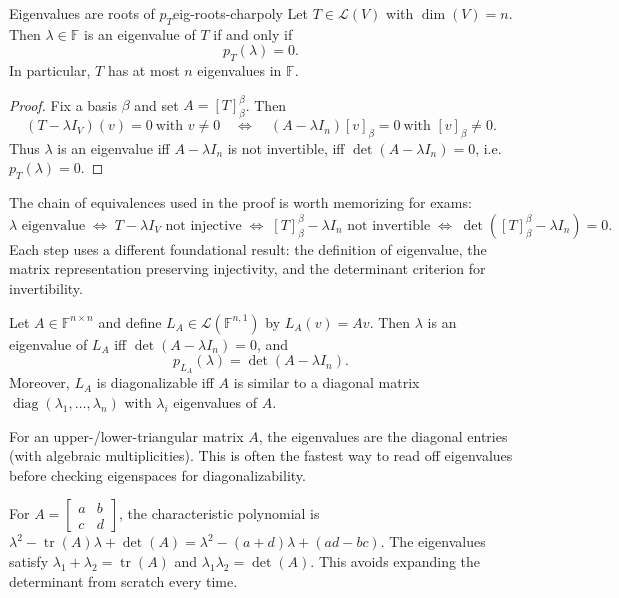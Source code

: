 \begin{theorem}{Eigenvalues are roots of $p_T$}{eig-roots-charpoly}
Let $T\in\mathcal{L}(V)$ with $\dim(V)=n$. Then $\lambda\in\mathbb{F}$ is an eigenvalue of $T$ if and only if
\[
p_T(\lambda)=0.
\]
In particular, $T$ has at most $n$ eigenvalues in $\mathbb{F}$.
\end{theorem}

\begin{proof}
Fix a basis $\beta$ and set $A=[T]_{\beta}^{\beta}$. Then
\[
(T-\lambda I_V)(v)=0 \ \text{with }v\neq 0
\quad\Longleftrightarrow\quad
(A-\lambda I_n)[v]_{\beta}=0 \ \text{with }[v]_{\beta}\neq 0.
\]
Thus $\lambda$ is an eigenvalue iff $A-\lambda I_n$ is not invertible, iff $\det(A-\lambda I_n)=0$, i.e.\ $p_T(\lambda)=0$.
\end{proof}

The chain of equivalences used in the proof is worth memorizing for exams:
\[
\lambda\text{ eigenvalue}
\;\Leftrightarrow\; T-\lambda I_V\text{ not injective}
\;\Leftrightarrow\; [T]_\beta^\beta-\lambda I_n\text{ not invertible}
\;\Leftrightarrow\; \det([T]_\beta^\beta-\lambda I_n)=0.
\]
Each step uses a different foundational result: the definition of eigenvalue, the matrix representation preserving injectivity, and the determinant criterion for invertibility.

\begin{examplebox}[title={Worked Example (Tutorial 9, Question 1): eigenvalues of $L_A(v)=Av$}]
Let $A\in\mathbb{F}^{n\times n}$ and define $L_A\in\mathcal{L}(\mathbb{F}^{n,1})$ by $L_A(v)=Av$.
Then $\lambda$ is an eigenvalue of $L_A$ iff $\det(A-\lambda I_n)=0$, and
\[
p_{L_A}(\lambda)=\det(A-\lambda I_n).
\]
Moreover, $L_A$ is diagonalizable iff $A$ is similar to a diagonal matrix $\operatorname{diag}(\lambda_1,\dots,\lambda_n)$ with $\lambda_i$ eigenvalues of $A$.
\end{examplebox}

\begin{examtip}[title={Exam Focus: fast eigenvalue computation}]
For an upper-/lower-triangular matrix $A$, the eigenvalues are the diagonal entries (with algebraic multiplicities).
This is often the fastest way to read off eigenvalues before checking eigenspaces for diagonalizability.
\end{examtip}

\begin{examtip}[title={Exam Focus: trace/determinant shortcuts for $2\times 2$ matrices}]
For $A=\begin{bmatrix}a&b\\c&d\end{bmatrix}$, the characteristic polynomial is $\lambda^2 - \operatorname{tr}(A)\lambda + \det(A) = \lambda^2-(a+d)\lambda+(ad-bc)$.
The eigenvalues satisfy $\lambda_1+\lambda_2=\operatorname{tr}(A)$ and $\lambda_1\lambda_2=\det(A)$.
This avoids expanding the determinant from scratch every time.
\end{examtip}

